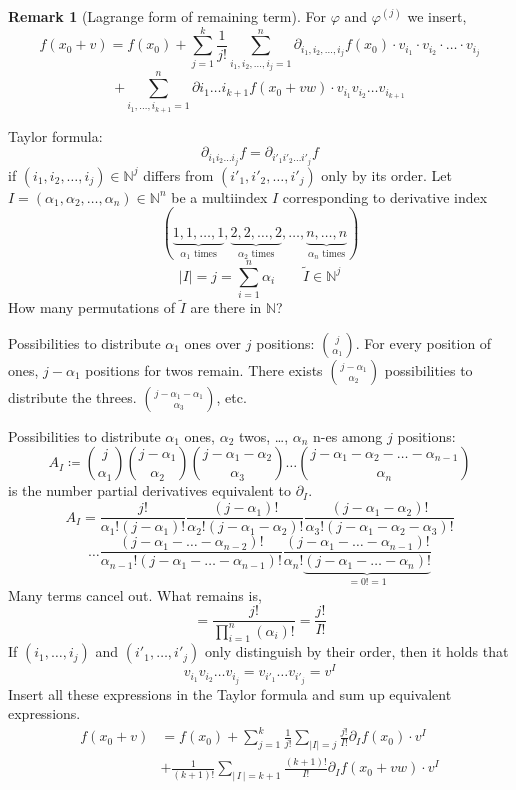 \documentclass[a4paper,landscape,twocolumn]{article}
\theoremstyle{definition}
\newtheorem{rem}{Remark}
\newcommand\abs[1]{\left|#1\right|}
\newcommand\card[1]{\left|\,#1\,\right|}
\begin{document}
\begin{rem}[Lagrange form of remaining term]
  For $\varphi$ and $\varphi^{(j)}$ we insert,
  \[ f(x_0 + v) = f(x_0) + \sum_{j=1}^k \frac{1}{j!} \sum_{i_1,i_2,\ldots,i_j=1}^n \partial_{i_1,i_2,\ldots,i_j} f(x_0) \cdot v_{i_1} \cdot v_{i_2} \cdot \ldots \cdot v_{i_j} \]
  \[ + \sum_{i_1,\ldots,i_{k+1}=1}^n \partial i_1 \ldots i_{k+1} f(x_0 + vw) \cdot v_{i_1} v_{i_2} \ldots v_{i_{k+1}} \]

  Taylor formula:
  \[ \partial_{i_1 i_2 \ldots i_j} f = \partial_{i'_1 i'_2 \ldots i'_j} f \]
  if $(i_1, i_2, \ldots, i_j) \in \mathbb N^j$ differs from $(i'_1, i'_2, \ldots, i'_j)$ only by its order.
  Let $I = (\alpha_1, \alpha_2, \ldots, \alpha_n) \in \mathbb N^n$ be a multiindex $I$ corresponding to
  derivative index
  \[ (\underbrace{1, 1, \ldots, 1}_{\alpha_1 \text{ times}}, \underbrace{2, 2, \ldots, 2}_{\alpha_2 \text{ times}}, \ldots, \underbrace{n, \ldots, n}_{\alpha_n \text{ times}}) \]
  \[ \abs{I} = j = \sum_{i=1}^n \alpha_i \qquad \tilde{I} \in \mathbb N^j \]
  How many permutations of $\tilde{I}$ are there in $\mathbb N$?

  Possibilities to distribute $\alpha_1$ ones over $j$ positions: $\binom{j}{\alpha_1}$.
  For every position of ones, $j - \alpha_1$ positions for twos remain.
  There exists $\binom{j-\alpha_1}{\alpha_2}$ possibilities to distribute the threes.
  $\binom{j-\alpha_1-\alpha_1}{\alpha_3}$, etc.

  Possibilities to distribute $\alpha_1$ ones, $\alpha_2$ twos, \dots, $\alpha_n$ n-es among $j$ positions:
  \[ A_I \coloneqq \binom{j}{\alpha_1} \binom{j-\alpha_1}{\alpha_2} \binom{j-\alpha_1-\alpha_2}{\alpha_3} \ldots \binom{j-\alpha_1-\alpha_2-\ldots-\alpha_{n-1}}{\alpha_n} \]
  is the number partial derivatives equivalent to $\partial_I$.
  \[ A_I = \frac{j!}{\alpha_1! (j-\alpha_1)!} \frac{(j-\alpha_1)!}{\alpha_2! (j - \alpha_1 - \alpha_2)!} \frac{(j-\alpha_1-\alpha_2)!}{\alpha_3!(j-\alpha_1 - \alpha_2 - \alpha_3)!} \]
  \[ \ldots \frac{(j-\alpha_1-\ldots-\alpha_{n-2})!}{\alpha_{n-1}!(j-\alpha_1-\ldots-\alpha_{n-1})!} \frac{(j-\alpha_1-\ldots-\alpha_{n-1})!}{\alpha_n! \underbrace{(j-\alpha_1-\ldots-\alpha_n)!}_{=0!=1}} \]
  Many terms cancel out. What remains is,
  \[ = \frac{j!}{\prod_{i=1}^n (\alpha_i)!} = \frac{j!}{I!} \]
  If $(i_1, \ldots, i_j)$ and $(i'_1, \ldots, i'_j)$ only distinguish by their order, then it holds that
  \[ v_{i_1} v_{i_2} \ldots v_{i_j} = v_{i'_1} \ldots v_{i'_j} = v^I \]
  Insert all these expressions in the Taylor formula and sum up equivalent expressions.
  \begin{align*}
    f(x_0 + v) &= f(x_0) + \sum_{j=1}^k \frac{1}{j!} \sum_{\abs{I}=j} \frac{j!}{I!} \partial_I f(x_0) \cdot v^I \\
    &+ \frac{1}{(k+1)!} \sum_{\card{I}=k+1} \frac{(k+1)!}{I!} \partial_I f(x_0 + vw) \cdot v^I
  \end{align*}
\end{rem}
\end{document}

